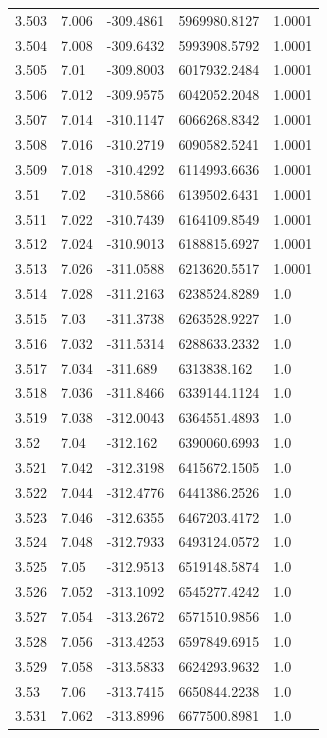 \begin{tabular}{lllll}
3.503 & 7.006 & -309.4861 & 5969980.8127 & 1.0001 \\
3.504 & 7.008 & -309.6432 & 5993908.5792 & 1.0001 \\
3.505 & 7.01 & -309.8003 & 6017932.2484 & 1.0001 \\
3.506 & 7.012 & -309.9575 & 6042052.2048 & 1.0001 \\
3.507 & 7.014 & -310.1147 & 6066268.8342 & 1.0001 \\
3.508 & 7.016 & -310.2719 & 6090582.5241 & 1.0001 \\
3.509 & 7.018 & -310.4292 & 6114993.6636 & 1.0001 \\
3.51 & 7.02 & -310.5866 & 6139502.6431 & 1.0001 \\
3.511 & 7.022 & -310.7439 & 6164109.8549 & 1.0001 \\
3.512 & 7.024 & -310.9013 & 6188815.6927 & 1.0001 \\
3.513 & 7.026 & -311.0588 & 6213620.5517 & 1.0001 \\
3.514 & 7.028 & -311.2163 & 6238524.8289 & 1.0 \\
3.515 & 7.03 & -311.3738 & 6263528.9227 & 1.0 \\
3.516 & 7.032 & -311.5314 & 6288633.2332 & 1.0 \\
3.517 & 7.034 & -311.689 & 6313838.162 & 1.0 \\
3.518 & 7.036 & -311.8466 & 6339144.1124 & 1.0 \\
3.519 & 7.038 & -312.0043 & 6364551.4893 & 1.0 \\
3.52 & 7.04 & -312.162 & 6390060.6993 & 1.0 \\
3.521 & 7.042 & -312.3198 & 6415672.1505 & 1.0 \\
3.522 & 7.044 & -312.4776 & 6441386.2526 & 1.0 \\
3.523 & 7.046 & -312.6355 & 6467203.4172 & 1.0 \\
3.524 & 7.048 & -312.7933 & 6493124.0572 & 1.0 \\
3.525 & 7.05 & -312.9513 & 6519148.5874 & 1.0 \\
3.526 & 7.052 & -313.1092 & 6545277.4242 & 1.0 \\
3.527 & 7.054 & -313.2672 & 6571510.9856 & 1.0 \\
3.528 & 7.056 & -313.4253 & 6597849.6915 & 1.0 \\
3.529 & 7.058 & -313.5833 & 6624293.9632 & 1.0 \\
3.53 & 7.06 & -313.7415 & 6650844.2238 & 1.0 \\
3.531 & 7.062 & -313.8996 & 6677500.8981 & 1.0 \\

\end{tabular}
